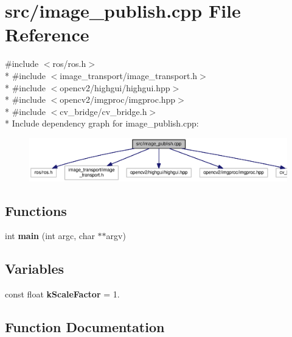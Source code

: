 \section{src/image\-\_\-publish.cpp File Reference}
\label{image__publish_8cpp}
{\ttfamily \#include $<$ros/ros.\-h$>$}\\*
{\ttfamily \#include $<$image\-\_\-transport/image\-\_\-transport.\-h$>$}\\*
{\ttfamily \#include $<$opencv2/highgui/highgui.\-hpp$>$}\\*
{\ttfamily \#include $<$opencv2/imgproc/imgproc.\-hpp$>$}\\*
{\ttfamily \#include $<$cv\-\_\-bridge/cv\-\_\-bridge.\-h$>$}\\*
Include dependency graph for image\-\_\-publish.\-cpp\-:
\nopagebreak
\begin{figure}[H]
\begin{center}
\leavevmode
\includegraphics[width=350pt]{image__publish_8cpp__incl}
\end{center}
\end{figure}
\subsection*{Functions}
\begin{DoxyCompactItemize}
\item 
int {\bf main} (int argc, char $\ast$$\ast$argv)
\end{DoxyCompactItemize}
\subsection*{Variables}
\begin{DoxyCompactItemize}
\item 
const float {\bf k\-Scale\-Factor} = 1.
\end{DoxyCompactItemize}


\subsection{Function Documentation}
